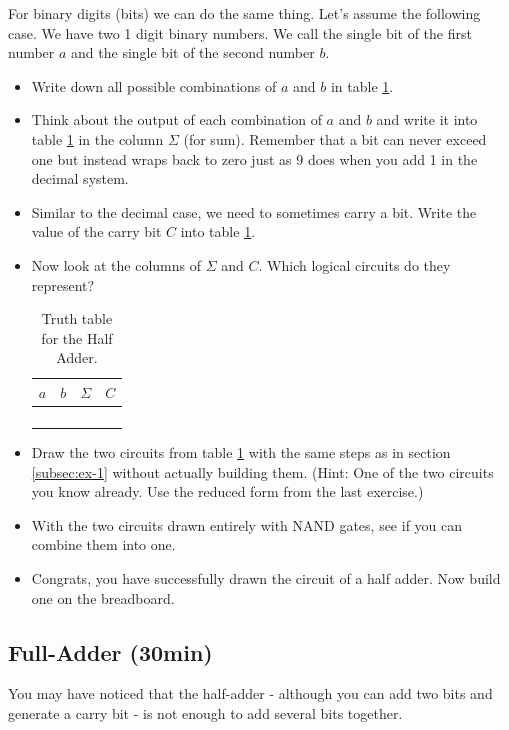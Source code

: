 \documentclass[10pt,a4paper]{article}
\begin{document}
For binary digits (bits) we can do the same thing. Let's assume the following case. We have two 1 digit binary numbers. We call the single bit of the first number $a$ and the single bit of the second number $b$.
\begin{itemize}
	\item Write down all possible combinations of $a$ and $b$ in table \ref{tab:half-adder-truth-table}.
	\item Think about the output of each combination of $a$ and $b$ and write it into table \ref{tab:half-adder-truth-table} in the column $\Sigma$ (for sum). Remember that a bit can never exceed one but instead wraps back to zero just as 9 does when you add 1 in the decimal system. 
	\item Similar to the decimal case, we need to sometimes carry a bit. Write the value of the carry bit $C$ into table \ref{tab:half-adder-truth-table}.
	\item Now look at the columns of $\Sigma$ and $C$. Which logical circuits do they represent?
	
	\begin{table}[H]
		\centering
		\begin{tabular}{|c|c||c|c|}
			\hline
			$a$ & $b$ & $\Sigma$   & $C$ \\ \hline
			&     &           &       \\ \hline
			&     &           &       \\ \hline
			&     &           &       \\ \hline
			&     &           &       \\ \hline
		\end{tabular}
		\caption{Truth table for the Half Adder.}
		\label{tab:half-adder-truth-table}
	\end{table}
	
	\item Draw the two circuits from table \ref{tab:half-adder-truth-table} with the same steps as in section \ref{subsec:ex-1} without actually building them. (Hint: One of the two circuits you know already. Use the reduced form from the last exercise.)
	\item With the two circuits drawn entirely with NAND gates, see if you can combine them into one.
	\item Congrats, you have successfully drawn the circuit of a half adder. Now build one on the breadboard.
\end{itemize}
\subsection{Full-Adder (30min)}
You may have noticed that the half-adder - although you can add two bits and generate a carry bit - is not enough to add several bits together.
\end{document}
